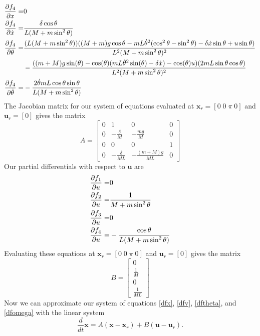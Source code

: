 \documentclass[]{article}
\newcommand{\bx}{\boldsymbol{x}}
\newcommand{\bu}{\boldsymbol{u}}
\begin{document}
\begin{eqnarray*}
	\pdv{f_4}{x} = & 0 \\
	\pdv{f_4}{\dot{x}} =&  \frac{\delta \cos \theta}{L(M + m \sin^2 \theta)} \\
	\pdv{f_4}{\theta} =  &  \frac{(L(M + m \sin^2 \theta))((M+m)g \cos \theta -mL\dot{\theta}^2(\cos^2 \theta - \sin^2 \theta) -\delta \dot{x} \sin \theta + u \sin \theta)}{L^2(M + m \sin^2 \theta)^2} \\
	& - \frac{((m+M)g\sin(\theta)-\cos(\theta)(mL{\dot{\theta}}^2\sin(\theta)-\delta \dot{x})-\cos(\theta)u)(2mL \sin \theta \cos \theta)}{L^2(M + m \sin^2 \theta)^2} \\
	\pdv{f_4}{\dot{\theta}} = & -\frac{2\dot{\theta}mL \cos \theta \sin \theta}{L(M + m \sin^2 \theta)}
\end{eqnarray*}
The Jacobian matrix for our system of equations evaluated at $\bx_r = [0\; 0\; \pi \; 0]$ and $\bu_r = [0]$ gives the matrix
\begin{equation}
		A = 
	\begin{bmatrix}
		0 & 1              & 0                          & 0 \\
		0 & -\frac{\delta}{M}      & -\frac{mg}{M}                 & 0 \\
		0 & 0              & 0                          & 1 \\
		0 & -\frac{\delta}{ML} & -\frac{(m+M)g}{ML} & 0
	\end{bmatrix}
\end{equation}
Our partial differentials with respect to $\bu$ are
\begin{eqnarray*}
	\pdv{f_1}{u} = & 0 \\
	\pdv{f_2}{u} = & \frac{1}{M + m \sin^2 \theta}\\
	\pdv{f_3}{u} =  & 0 \\
	\pdv{f_4}{u} = & -\frac{\cos \theta}{L(M + m \sin^2 \theta)}
\end{eqnarray*}
Evaluating these equations at $\bx_r = [0\; 0\; \pi \; 0]$ and $\bu_r = [0]$ gives the matrix
\begin{equation}
	B = 
	\begin{bmatrix}
		0 \\
		\frac{1}{M}  \\
		0  \\
		\frac{1}{ML}   
	\end{bmatrix}
\end{equation}
Now we can approximate our system of equations \eqref{dfx}, \eqref{dfv}, \eqref{dftheta}, and \eqref{dfomega} with the linear system
\begin{equation}
	\frac{d}{dt} \bx = A(\bx - \bx_r) + B (\bu - \bu_r). \label{lin_mod}
\end{equation}
\end{document}
